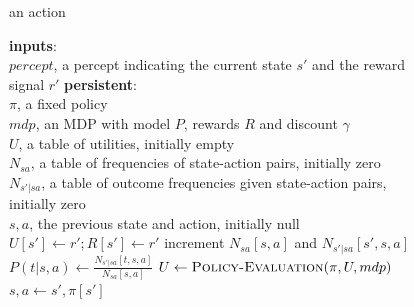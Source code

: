 \documentclass[11pt]{article}
\begin{document}
\begin{figure}[!htb]
\begin{algorithmic}[1]
 \Return an action

\State \textbf{inputs}: \\
\hspace*{\algorithmicindent} \hspace*{\algorithmicindent} $percept$, a percept indicating the current state $s'$ and the reward signal $r'$
\State \textbf{persistent}: \\
\hspace*{\algorithmicindent} \hspace*{\algorithmicindent} $\pi$, a fixed policy\\
\hspace*{\algorithmicindent} \hspace*{\algorithmicindent} $mdp$, an MDP with model $P$, rewards $R$ and discount $\gamma$\\
\hspace*{\algorithmicindent} \hspace*{\algorithmicindent} $U$, a table of utilities, initially empty\\
\hspace*{\algorithmicindent} \hspace*{\algorithmicindent} $N_{sa}$, a table of frequencies of state-action pairs, initially zero\\
\hspace*{\algorithmicindent} \hspace*{\algorithmicindent} $N_{s' | sa}$, a table of outcome frequencies given state-action pairs, initially zero\\
\hspace*{\algorithmicindent} \hspace*{\algorithmicindent} $s, a$, the previous state and action, initially null\\

 $U[s'] \leftarrow r'; R[s'] \leftarrow r'$ \EndIf
{}
\State increment $N_{sa}[s, a]$ and $N_{s' |sa}[s', s, a]$
\EndIf
{}
\State $P(t|s,a) \leftarrow \frac{N_{s'|sa}[t,s,a]}{N_{sa}[s,a]}$
\EndFor
\State $U \leftarrow \textsc{Policy-Evaluation}(\pi, U, mdp)$
\Else $s,a \leftarrow s', \pi[s']$ \EndIf
\EndProcedure
\end{algorithmic}
\end{figure}
\end{document}
